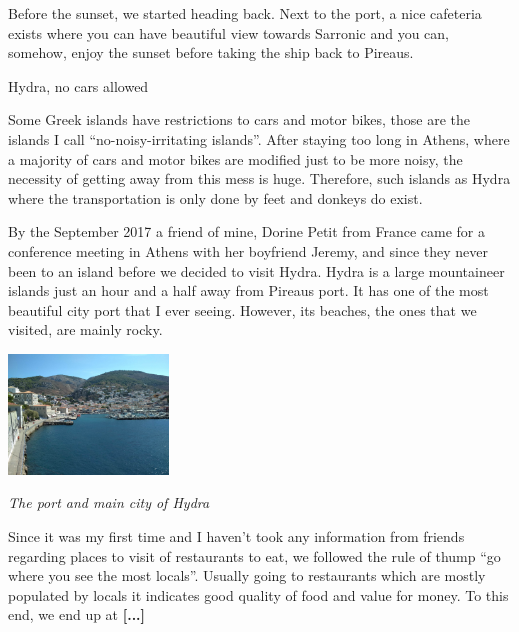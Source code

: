 \documentclass[10pt,a4paper]{article} %
\newcommand{\NewsItem}[1]{ %
\usefont{T1}{fvs}{n}{n} %
\vspace{24pt}\large #1\vspace{3pt} %
\par \normalsize \normalfont}
\begin{document}
\begin{multicols}{3}
Before the sunset, we started heading back. 
Next to the port, a nice cafeteria exists where you can have beautiful view 
towards Sarronic and you can, somehow, enjoy the sunset before taking the ship 
back to Pireaus.


\NewsItem{Hydra, no cars allowed}


Some Greek islands have restrictions to cars and motor bikes, those are the islands 
I call ``no-noisy-irritating islands''. 
After staying too long in Athens, where a majority of cars and motor bikes are modified 
just to be more noisy, the necessity of getting away from this mess is huge. 
Therefore, such islands as Hydra where the transportation is only done by feet and 
donkeys do exist. 


By the September 2017 a friend of mine, Dorine Petit from France came for a 
conference meeting in Athens with her boyfriend Jeremy, and since they 
never been to an island before we decided to visit Hydra. 
Hydra is a large mountaineer islands just an hour and a half away from Pireaus 
port. 
It has one of the most beautiful city port that I ever seeing. 
However, its beaches, the ones that we visited, are mainly rocky.  

\begin{center}
	\includegraphics[width=0.32\textwidth]{media/hydra_port}
	\par\textit{The port and main city of Hydra}
\end{center}


Since it was my first time and I haven't took any information from friends 
regarding places to visit of restaurants to eat, we followed the rule of thump 
``go where you see the most locals''. 
Usually going to restaurants which are mostly populated by locals it indicates 
good quality of food and value for money. 
To this end, we end up at \textbf{[...]}



\end{multicols}
\end{document}

